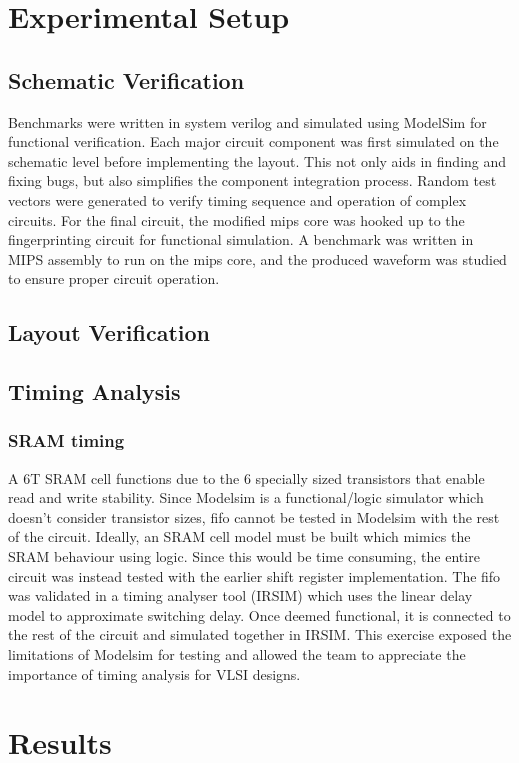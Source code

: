 \documentclass[12pt,journal,compsoc]{IEEEtran}
\begin{document}

\section{Experimental Setup}
\subsection{Schematic Verification}
Benchmarks were written in system verilog and simulated using ModelSim for functional verification. Each major circuit component was first simulated on the schematic level before implementing the layout. This not only aids in finding and fixing bugs, but also simplifies the component integration process. Random test vectors were generated to verify timing sequence and operation of complex circuits.
For the final circuit, the modified mips core was hooked up to the fingerprinting circuit for functional simulation. A benchmark was written in MIPS assembly to run on the mips core, and the produced waveform was studied to ensure proper circuit operation. 

\subsection{Layout Verification}
\subsection{Timing Analysis}
\subsubsection {SRAM timing}
A 6T SRAM cell functions due to the 6 specially sized transistors that enable read and write stability. Since Modelsim is a functional/logic simulator which doesn’t consider transistor sizes, fifo cannot be tested in Modelsim with the rest of the circuit. Ideally, an SRAM cell model must be built which mimics the SRAM behaviour using logic. Since this would be time consuming, the entire circuit was instead tested with the earlier shift register implementation. The fifo was validated in a timing analyser tool (IRSIM) which uses the linear delay model to approximate switching delay. Once deemed functional, it is connected to the rest of the circuit and simulated together in IRSIM. This exercise exposed the limitations of Modelsim for testing and allowed the team to appreciate the importance of timing analysis for VLSI designs.
\section{Results}
\end{document}
